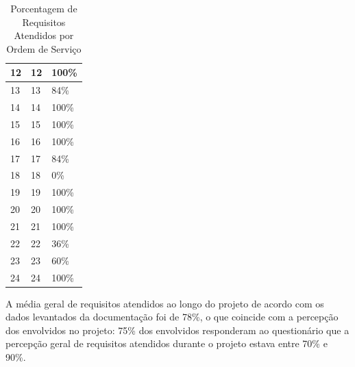 \begin{table}[H]
\begin{tabular}{|l|l|l|}
12              & 12          & 100\%                                                                                    \\ \hline
13              & 13          & 84\%                                                                                     \\ \hline
14              & 14          & 100\%                                                                                    \\ \hline
15              & 15          & 100\%                                                                                    \\ \hline
16              & 16          & 100\%                                                                                    \\ \hline
17              & 17          & 84\%                                                                                     \\ \hline
18              & 18          & 0\%                                                                                      \\ \hline
19              & 19          & 100\%                                                                                    \\ \hline
20              & 20          & 100\%                                                                                    \\ \hline
21              & 21          & 100\%                                                                                    \\ \hline
22              & 22          & 36\%                                                                                     \\ \hline
23              & 23          & 60\%                                                                                     \\ \hline
24              & 24          & 100\%                                                                                    \\ \hline
\end{tabular}
\caption{Porcentagem de Requisitos Atendidos por Ordem de Serviço}
		\label{porcentagemrequisitos}
\end{table}

 A média geral de requisitos atendidos ao longo do projeto de acordo com os dados levantados da documentação foi de 78\%, o que coincide com a percepção dos envolvidos no projeto: 75\% dos envolvidos responderam ao questionário que a percepção geral de requisitos atendidos durante o projeto estava entre 70\% e 90\%.

